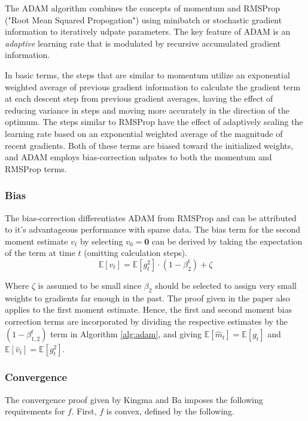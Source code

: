 \documentclass[letterpaper,11 pt]{article}
\begin{document}
The ADAM algorithm combines the concepts of momentum and RMSProp ("Root Mean Squared Propogation") using minibatch or stochastic gradient information to iteratively udpate parameters. The key feature of ADAM is an \textit{adaptive} learning rate that is modulated by recursive accumulated gradient information.  

In basic terms, the steps that are similar to momentum utilize an exponential weighted average of previous gradient information to calculate the gradient term at each descent step from previous gradient averages, having the effect of reducing variance in steps and moving more accurately in the direction of the optimum.  The steps similar to RMSProp have the effect of adaptively scaling the learning rate based on an exponential weighted average of the magnitude of recent gradients.  Both of these terms are biased toward the initialized weights, and ADAM employs bias-correction udpates to both the momentum and RMSProp terms.  

\subsubsection{Bias}

The bias-correction differentiates ADAM from RMSProp and can be attributed to it's advantageous performance with sparse data. The bias term for the second moment estimate $v_{t}$ by selecting $v_{0}=\textbf{0}$ can be derived by taking the expectation of the term at time $t$ (omitting calculation steps).
\[
\mathbb{E}[v_{t}]=\mathbb{E}[g_{t}^{2}]\cdot(1-\beta_{2}^{t})+\zeta
\]

Where $\zeta$ is assumed to be small since $\beta_{2}$ should be selected to assign very small weights to gradients far enough in the past.  The proof given in the paper also applies to the first moment estimate.  Hence, the first  and second moment bias correction terms are incorporated by dividing the respective estimates by the $(1-\beta_{1,2}^t)$ term in Algorithm \ref{alg:adam}, and giving  $\mathbb{E}[\hat{m}_{t}]=\mathbb{E}[g_{t}]$ and $\mathbb{E}[\hat{v}_{t}]=\mathbb{E}[g_{t}^{2}]$.

\subsubsection{Convergence}

The convergence proof given by Kingma and Ba imposes the following requirements for $f$.  First, $f$ is convex, defined by the following.
\end{document}
